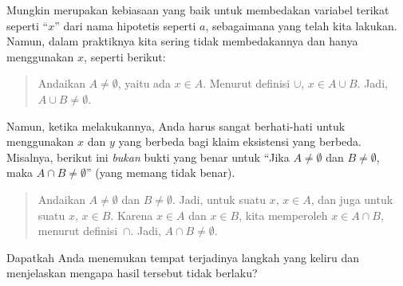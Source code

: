 \documentclass[../../../include/open-logic-section]{subfiles}
\begin{document}
Mungkin merupakan kebiasaan yang baik untuk membedakan variabel
terikat seperti ``$x$'' dari nama hipotetis seperti $a$, sebagaimana
yang telah kita lakukan. Namun, dalam praktiknya kita sering tidak
membedakannya dan hanya menggunakan $x$, seperti berikut:
\begin{quote}
Andaikan $A \neq \emptyset$, yaitu ada $x \in A$. Menurut definisi
$\cup$, $x \in A \cup B$. Jadi, $A \cup B \neq \emptyset$.
\end{quote}
Namun, ketika melakukannya, Anda harus sangat berhati-hati untuk
menggunakan $x$ dan $y$ yang berbeda bagi klaim eksistensi yang
berbeda. Misalnya, berikut ini \emph{bukan} bukti yang benar untuk
``Jika $A \neq \emptyset$ dan $B \neq \emptyset$, maka $A \cap B \neq
\emptyset$'' (yang memang tidak benar).
\begin{quote}
Andaikan $A \neq \emptyset$ dan $B \neq \emptyset$. Jadi, untuk suatu
$x$, $x \in A$, dan juga untuk suatu $x$, $x \in B$. Karena $x \in A$
dan $x \in B$, kita memperoleh $x \in A \cap B$, menurut
definisi~$\cap$. Jadi, $A \cap B \neq \emptyset$.
\end{quote}
Dapatkah Anda menemukan tempat terjadinya langkah yang keliru dan
menjelaskan mengapa hasil tersebut tidak berlaku?
\end{document}
